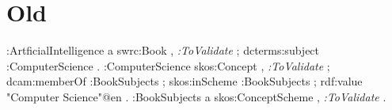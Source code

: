\documentclass[a4paper,fontsize=11pt]{scrartcl}
\begin{document}
\section{Old}

\begin{ex}[commandchars=\\\{\}]
:ArtficialIntelligence
	a swrc:Book , \textit{:ToValidate} ;
	dcterms:subject :ComputerScience .
:ComputerScience
	skos:Concept , \textit{:ToValidate} ;
	dcam:memberOf :BookSubjects ;
	skos:inScheme :BookSubjects ;
	rdf:value "Computer Science"@en .
:BookSubjects
	a skos:ConceptScheme , \textit{:ToValidate} .
\end{ex}

{}

\setcounter{tocdepth}{1}
\end{document}
